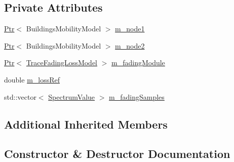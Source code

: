 \subsection*{Private Attributes}
\begin{DoxyCompactItemize}
\item 
\hyperlink{classns3_1_1Ptr}{Ptr}$<$ Buildings\+Mobility\+Model $>$ \hyperlink{classLteFadingTestCase_a88394c0e0a628f556322e2f7347a9ced}{m\+\_\+node1}
\item 
\hyperlink{classns3_1_1Ptr}{Ptr}$<$ Buildings\+Mobility\+Model $>$ \hyperlink{classLteFadingTestCase_a96f66fad68494e4d82ceb56c7f883d78}{m\+\_\+node2}
\item 
\hyperlink{classns3_1_1Ptr}{Ptr}$<$ \hyperlink{classns3_1_1TraceFadingLossModel}{Trace\+Fading\+Loss\+Model} $>$ \hyperlink{classLteFadingTestCase_a0d917234b65dc135ed04a2c09f9aae7b}{m\+\_\+fading\+Module}
\item 
double \hyperlink{classLteFadingTestCase_a6bdc7bd64691c8f657cf9810a4fc91db}{m\+\_\+loss\+Ref}
\item 
std\+::vector$<$ \hyperlink{classns3_1_1SpectrumValue}{Spectrum\+Value} $>$ \hyperlink{classLteFadingTestCase_a80f3baa4e47676602f9becabc28fc975}{m\+\_\+fading\+Samples}
\end{DoxyCompactItemize}
\subsection*{Additional Inherited Members}


\subsection{Constructor \& Destructor Documentation}
